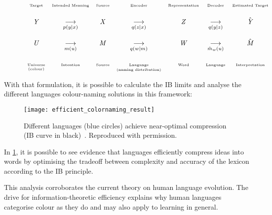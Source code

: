     \begin{figure}[ht!]
        \centering
        \begin{align*}
            \begin{array}{ccccccc}
                \tiny \text{Target} & \tiny \text{Intended Meaning} &\tiny \text{Source} &\tiny \text{Encoder} & \tiny \text{Representation}&\tiny \text{Decoder}  &\tiny \text{Estimated Target}\hspace{\fill} \\
                    \\
                \rvY &\underset{p(y|x)}{\longrightarrow} &\rvX &\underset{q(z|x)}{\longrightarrow}&\rvZ&\underset{q(y|z)}{\longrightarrow}  &\hat{\rvY} \\ \\
                \rvU &\underset{m(u)}{\longrightarrow} &\rvM &\underset{q(w|m)}{\longrightarrow}&\rvW&\underset{\hat{m}_w(u)}{\longrightarrow}  &\hat{\rvM} \\ \\
                \tiny \underset{ \text{\tiny(colour)}}{\text{Universe}} & \tiny \text{Intention} &\tiny \text{Source} &\tiny \underset{\text{\tiny (naming distribution)}}{\text{Language}}&\tiny \text{Word}&\tiny \text{Language}  &\tiny \text{Interpretation}
            \end{array}
        \end{align*}
    \end{figure}

    With that formulation, it is possible to calculate the IB limits and analyse the different languages colour-naming solutions in this framework:
    \begin{figure}[hbt!]
        \centering
        \texttt{[image: efficient\_colornaming\_result]}
        \caption{Different languages (blue circles) achieve near-optimal compression (IB curve in black)~. Reproduced with permission.}\label{efficient_colornaming_result}
    \end{figure}

    In \cref{efficient_colornaming_result}, it is possible to see evidence that languages efficiently compress ideas into words by optimising the tradeoff between complexity and accuracy of the lexicon according to the IB principle.

    This analysis corroborates the current theory on human language evolution. The drive for information-theoretic efficiency explains why human languages categorise colour as they do and may also apply to learning in general.


